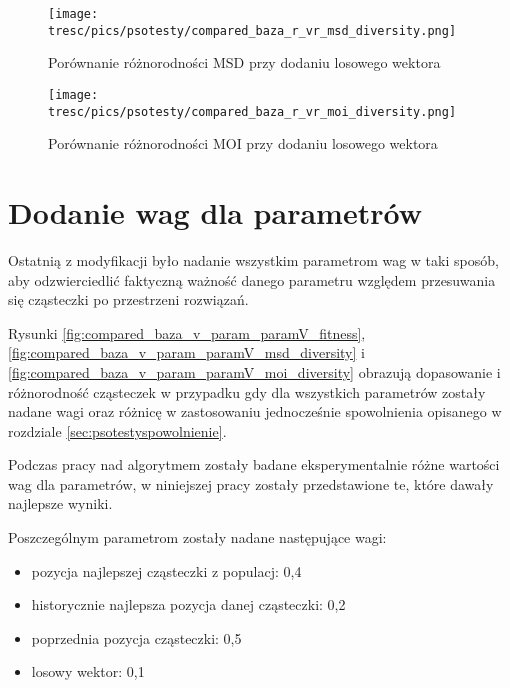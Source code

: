 \begin{figure}[H]
\begin{center} 
\texttt{[image: tresc/pics/psotesty/compared\_baza\_r\_vr\_msd\_diversity.png]}
\caption{Porównanie różnorodności MSD przy dodaniu losowego wektora}
\label{fig:compared_baza_r_vr_msd_diversity}
\end{center}
\end{figure}

\begin{figure}[H]
\begin{center} 
\texttt{[image: tresc/pics/psotesty/compared\_baza\_r\_vr\_moi\_diversity.png]}
\caption{Porównanie różnorodności MOI przy dodaniu losowego wektora}
\label{fig:compared_baza_r_vr_moi_diversity}
\end{center}
\end{figure}



\section{Dodanie wag dla parametrów}

Ostatnią z modyfikacji było nadanie wszystkim parametrom wag w taki sposób, aby odzwierciedlić faktyczną  ważność danego parametru względem przesuwania się cząsteczki po przestrzeni rozwiązań.

Rysunki \ref{fig:compared_baza_v_param_paramV_fitness}, \ref{fig:compared_baza_v_param_paramV_msd_diversity} i \ref{fig:compared_baza_v_param_paramV_moi_diversity} obrazują dopasowanie i różnorodność cząsteczek w przypadku gdy dla wszystkich parametrów zostały nadane wagi oraz różnicę w zastosowaniu jednocześnie spowolnienia opisanego w rozdziale \ref{sec:psotestyspowolnienie}. 

Podczas pracy nad algorytmem zostały badane eksperymentalnie różne wartości wag dla parametrów, w niniejszej pracy zostały przedstawione te, które dawały najlepsze wyniki.

Poszczególnym parametrom zostały nadane następujące wagi:
\begin{itemize}
\item pozycja najlepszej cząsteczki z populacj: 0,4
\item historycznie najlepsza pozycja danej cząsteczki: 0,2
\item poprzednia pozycja cząsteczki: 0,5
\item losowy wektor: 0,1
\end{itemize}


